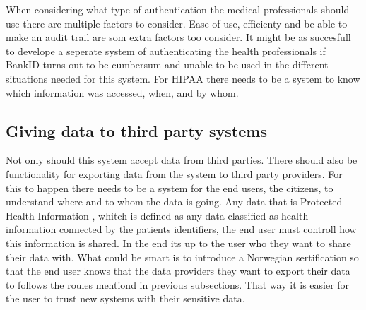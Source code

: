 When considering what type of authentication the medical professionals should use there are multiple factors to consider. 
Ease of use, efficienty and be able to make an audit trail are som extra factors too consider.
It might be as succesfull to develope a seperate system of authenticating the health professionals if BankID turns out to be cumbersum and unable to be used in the different situations needed for this system. 
For HIPAA there needs to be a system to know which information was accessed, when, and by whom. \cite{Audit}

\subsection{Giving data to third party systems}
Not only should this system accept data from third parties. 
There should also be functionality for exporting data from the system to third party providers. 
For this to happen there needs to be a system for the end users, the citizens, to understand where and to whom the data is going.
Any data that is Protected Health Information \cite{PHI}, whitch is defined as any data classified as health information connected by the patients identifiers, the end user must controll how this information is shared. 
In the end its up to the user who they want to share their data with.
What could be smart is to introduce a Norwegian sertification so that the end user knows that the data providers they want to export their data to follows the roules mentiond in previous subsections. 
That way it is easier for the user to trust new systems with their sensitive data.
